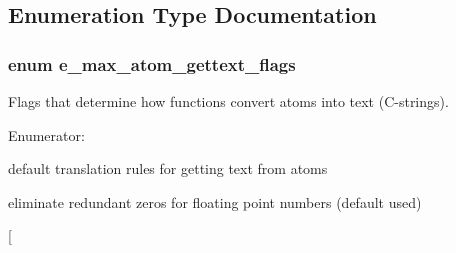 \subsection{Enumeration Type Documentation}
\hypertarget{group__atom_ga42fa1c131691f55dbc781a0be60e3772}{
\subsubsection[{e\_\-max\_\-atom\_\-gettext\_\-flags}]{\setlength{\rightskip}{0pt plus 5cm}enum {\bf e\_\-max\_\-atom\_\-gettext\_\-flags}}}
\label{group__atom_ga42fa1c131691f55dbc781a0be60e3772}


Flags that determine how functions convert atoms into text (C-\/strings). \begin{Desc}
\item[Enumerator: ]\par
\begin{description}
\item[{\em 
\hypertarget{group__atom_gga42fa1c131691f55dbc781a0be60e3772a2e8bad722419a8be35f8ef13364ddcc7}{
OBEX\_\-UTIL\_\-ATOM\_\-GETTEXT\_\-DEFAULT}
\label{group__atom_gga42fa1c131691f55dbc781a0be60e3772a2e8bad722419a8be35f8ef13364ddcc7}
}]default translation rules for getting text from atoms \item[{\em 
\hypertarget{group__atom_gga42fa1c131691f55dbc781a0be60e3772a433f595f519e0a4051d769db66b9b5d8}{
OBEX\_\-UTIL\_\-ATOM\_\-GETTEXT\_\-TRUNCATE\_\-ZEROS}
\label{group__atom_gga42fa1c131691f55dbc781a0be60e3772a433f595f519e0a4051d769db66b9b5d8}
}]eliminate redundant zeros for floating point numbers (default used) \item[{\em 
}
\end{description}
\end{Desc}

